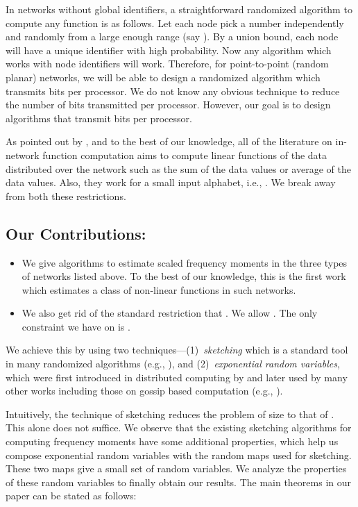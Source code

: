 \documentclass[10pt,twosided,a4paper,draft,onecolumn]{article}
\begin{document}
In networks without global identifiers, a straightforward randomized
algorithm to compute any function is as follows. Let each node pick a
number independently and randomly from a large enough range (say
). By a union bound, each node will have a unique identifier
with high probability. Now any algorithm which works with node
identifiers will work. Therefore, for point-to-point (random planar)
networks, we will be able to design a randomized algorithm which
transmits  bits per processor. We do not know any obvious
technique to reduce the number of bits transmitted per
processor. However, our goal is to design algorithms that transmit  bits per processor. 

As pointed out by \cite{Giridhar06}, and to the best of our knowledge,
all of the literature on in-network function computation aims to
compute linear functions of the data distributed over the network such as the
sum of the data values or average of the data values. Also, they work
for a small input alphabet, i.e., . We break away from both
these restrictions.

\subsection*{Our Contributions:}
\begin{itemize}
\item We give algorithms to estimate scaled frequency moments in the
  three types of networks listed above. To the best of our knowledge,
  this is the first work which estimates a class of non-linear functions in such
  networks.

\item We also get rid of the standard restriction that . We
  allow . The only constraint we have on  is
  .
\end{itemize}
We achieve this by using two
techniques---(1)~\emph{sketching} which is a standard tool in many
randomized algorithms (e.g., \cite{Muthukrishnan05,Motwani96}), and
(2)~\emph{exponential random variables}, which were first introduced
in distributed computing by \cite{Cohen97} and later used by many
other works including those on gossip based computation (e.g.,
\cite{Mosk-Aoyama06}).

Intuitively, the technique of sketching reduces the problem of size
 to that of . This alone does not suffice. We observe
that the existing sketching algorithms for computing frequency moments
have some additional properties, which help us compose exponential
random variables with the random maps used for sketching. These two
maps give a small set of random variables. We analyze the properties
of these random variables to finally obtain our results.  The main
theorems in our paper can be stated as follows:
\end{document}
